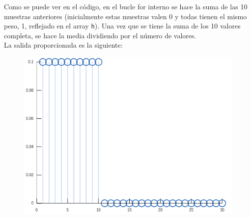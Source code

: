 \documentclass[11pt,a4paper]{article}
\begin{document}
Como se puede ver en el código, en el bucle for interno se hace la suma de las 10 muestras anteriores (inicialmente estas muestras valen 0 y todas tienen el mismo peso, 1, reflejado en el array \texttt{h}). Una vez que se tiene la suma de los 10 valores completa, se hace la media dividiendo por el número de valores.\\

La salida proporcionada es la siguiente:

\begin{figure}[H]
	\centering
	\includegraphics[scale=0.5]{img/fir-grafica.png}
\end{figure}
\end{document}
